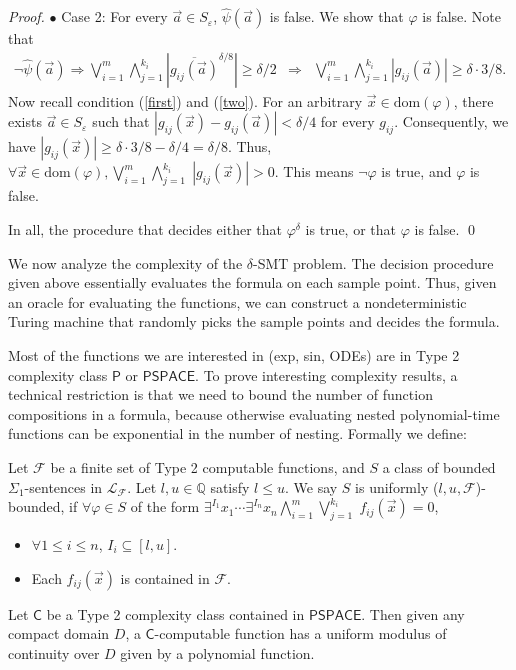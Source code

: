 \documentclass[envcountsect]{llncs}
\newcommand{\dom}{\mathrm{dom}}
\begin{document}
\begin{proof}
$\bullet$ Case 2: For every $\vec a\in S_{\varepsilon}$, $\widehat{\psi}(\vec a)$ is false. We show that $\varphi$ is false. Note that
\begin{eqnarray*}
\neg\widehat{\psi}(\vec a) \Rightarrow \bigvee_{i=1}^m \bigwedge_{j=1}^{k_i} |\overline{g_{ij}(\vec a)}^{\delta/8}|\geq\delta/2 
&\Rightarrow&\bigvee_{i=1}^m \bigwedge_{j=1}^{k_i} |g_{ij}(\vec a)|\geq \delta\cdot 3/8. 
\end{eqnarray*}
Now recall condition (\ref{first}) and (\ref{two}). For an arbitrary $\vec x\in \dom(\varphi)$, there exists $\vec a\in S_{\varepsilon}$ such that $|g_{ij}(\vec x)-g_{ij}(\vec a)|<\delta/4$ for every $g_{ij}$. Consequently, we have $|g_{ij}(\vec x)|\geq \delta\cdot 3/8- \delta/4 = \delta/8.$ Thus, $\forall \vec x\in \dom(\varphi), \bigvee_{i=1}^m\bigwedge_{j=1}^{k_i}\; |g_{ij}(\vec x)|>0.$ This means $\neg \varphi$ is true, and $\varphi$ is false. 

In all, the procedure that decides either that $\varphi^{\delta}$ is true, or that $\varphi$ is false. 
\qed\end{proof}

We now analyze the complexity of the $\delta$-SMT problem. The decision procedure given above essentially evaluates the formula on each sample point. Thus, given an oracle for evaluating the functions, we can construct a nondeterministic Turing machine that randomly picks the sample points and decides the formula.

Most of the functions we are interested in (exp, sin, ODEs) are in Type 2 complexity class $\mathsf{P}$ or $\mathsf{PSPACE}$. To prove interesting complexity results, a technical restriction is that we need to bound the number of function compositions in a formula, because otherwise evaluating nested polynomial-time functions can be exponential in the number of nesting. Formally we define: 
\begin{definition}
Let $\mathcal{F}$ be a finite set of Type 2 computable functions, and $S$ a class of bounded $\Sigma_1$-sentences in $\mathcal{L}_{\mathcal{F}}$. Let $l,u\in \mathbb{Q}$ satisfy $l\leq u$. We say $S$ is uniformly ($l,u,\mathcal{F}$)-bounded, if $\forall\varphi\in S$ of the form $\exists^{I_1}x_1\cdots\exists^{I_n}x_n \bigwedge_{i=1}^{m}\bigvee_{j=1}^{k_i}\;f_{ij}(\vec x)=0$,
\begin{itemize}
\item $\forall 1\leq i\leq n$, $I_i\subseteq [l,u]$. 
\item Each $f_{ij}(\vec x)$ is contained in $\mathcal{F}$. 
\end{itemize}
\end{definition}
\begin{proposition}\label{polym}
Let $\mathsf{C}$ be a Type 2 complexity class contained in $\mathsf{PSPACE}$. Then given any compact domain $D$, a $\mathsf{C}$-computable function has a uniform modulus of continuity over $D$ given by a polynomial function.
\end{proposition}
\end{document}
